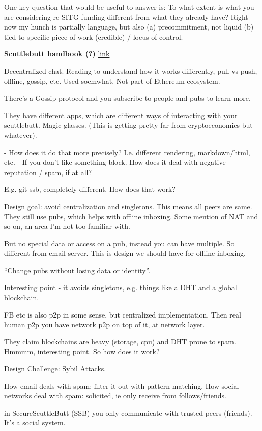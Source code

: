 \documentclass[12pt]{report}
\newcommand{\link}[2]{\href{#1}{#2}}
\begin{document}
One key question that would be useful to answer is: To what extent is what you
are considering re SITG funding different from what they already have? Right now
my hunch is partially language, but also (a) precommitment, not liquid (b) tied
to specific piece of work (credible) / locus of control.

\textbf{Scuttlebutt handbook (?)}
\link{https://www.scuttlebutt.nz/}{link}

Decentralized chat. Reading to understand how it works differently, pull vs
push, offline, gossip, etc. Used soemwhat. Not part of Ethereum ecosystem.

There's a Gossip protocol and you subscribe to people and pubs to learn more.

They have different apps, which are different ways of interacting with your
scuttlebutt. Magic glasses. (This is getting pretty far from cryptoeconomics but
whatever).

- How does it do that more precisely? I.e. different rendering, markdown/html, etc.
- If you don't like something block. How does it deal with negative reputation / spam, if at all?

E.g. git ssb, completely different. How does that work?

Design goal: avoid centralization and singletons. This means all peers are same.
They still use pubs, which helps with offline inboxing. Some mention of NAT and
so on, an area I'm not too familiar with.

But no special data or access on a pub, instead you can have multiple. So
different from email server. This is design we should have for offline inboxing.

``Change pubs without losing data or identity''.

Interesting point - it avoids singletons, e.g. things like a DHT and a global
blockchain.

FB etc is also p2p in some sense, but centralized implementation. Then real
human p2p you have network p2p on top of it, at network layer.

They claim blockchains are heavy (storage, cpu) and DHT prone to spam. Hmmmm,
interesting point. So how does it work?

Design Challenge: Sybil Attacks.

How email deals with spam: filter it out with pattern matching.
How social networks deal with spam: solicited, ie only receive from follows/friends.

in SecureScuttleButt (SSB) you only communicate with trusted peers (friends). It's a social system.
\end{document}
